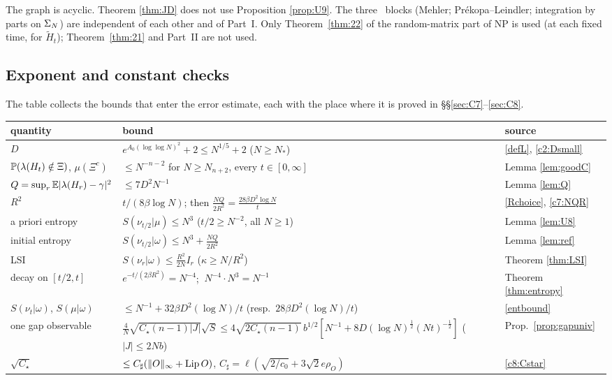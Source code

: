 The graph is acyclic. Theorem \ref{thm:JD} does not use Proposition \ref{prop:U9}. The three \INFRA\ blocks (Mehler; Pr\'ekopa--Leindler; integration by parts on $\Sig$) are independent of each other and of Part~I.
Only Theorem~\ref{thm:22} of the random-matrix part of NP is used (at each fixed time, for $\widetilde H_t$); Theorem~\ref{thm:21} and Part~II are not used.

\subsection{Exponent and constant checks}
The table collects the bounds that enter the error estimate, each with the place where it is proved in \S\S\ref{sec:C7}--\ref{sec:C8}.

\begin{center}\footnotesize
\renewcommand{\arraystretch}{1.25}
\begin{tabular}{|p{3.1cm}|p{9.1cm}|p{2.7cm}|}
\hline
quantity & bound & source\\\hline
$D$ & $e^{A_0(\log\log N)^2}+2\le N^{1/5}+2$ ($N\ge N_*$) & \eqref{defL}, \eqref{c2:Dsmall}\\
$\P(\lambda(H_t)\notin\Xi)$, $\mu(\Xi^c)$ & $\le N^{-n-2}$ for $N\ge N_{n+2}$, every $t\in[0,\infty]$ & Lemma \ref{lem:goodC}\\
$Q=\sup_r\E|\lambda(H_r)-\gamma|^2$ & $\le7D^2N^{-1}$ & Lemma \ref{lem:Q}\\
$R^2$ & $t/(8\beta\log N)$; then $\frac{NQ}{2R^2}=\frac{28\beta D^2\log N}t$ & \eqref{Rchoice}, \eqref{c7:NQR}\\
a priori entropy & $S(\nu_{t/2}|\mu)\le N^3$ ($t/2\ge N^{-2}$, all $N\ge1$) & Lemma \ref{lem:U8}\\
initial entropy & $S(\nu_{t/2}|\omega)\le N^3+\frac{NQ}{2R^2}$ & Lemma \ref{lem:ref}\\
LSI & $S(\nu_r|\omega)\le\frac{R^2}{2N}I_r$ ($\kappa\ge N/R^2$) & Theorem \ref{thm:LSI}\\
decay on $[t/2,t]$ & $e^{-t/(2\beta R^2)}=N^{-4}$; $\ N^{-4}\cdot N^3=N^{-1}$ & Theorem \ref{thm:entropy}\\
$S(\nu_t|\omega)$, $S(\mu|\omega)$ & $\le N^{-1}+32\beta D^2(\log N)/t$ (resp.\ $28\beta D^2(\log N)/t$) & \eqref{entbound}\\
one gap observable & $\frac4N\sqrt{C_\star(n-1)|J|}\sqrt{S}\le4\sqrt{2C_\star(n-1)}\,b^{1/2}[N^{-1}+8D(\log N)^{\frac12}(Nt)^{-\frac12}]$ ($|J|\le2Nb$) & Prop.\ \ref{prop:gapuniv}\\
$\sqrt{C_\star}$ & $\le C_\sharp(\|O\|_\infty+\Lip O)$, $C_\sharp=\ell(\sqrt{2/c_0}+3\sqrt2e\rho_O)$ & \eqref{c8:Cstar}\\

\end{tabular}
\end{center}
